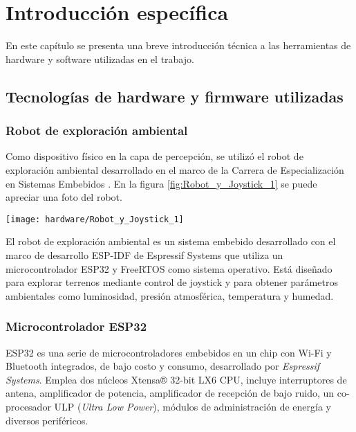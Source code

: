\chapter{Introducción específica} %

\label{Chapter2}



En este capítulo se presenta una breve introducción técnica a las herramientas de hardware y software utilizadas en el trabajo.

\section{Tecnologías de hardware y firmware utilizadas}


\subsection{Robot de exploración ambiental}

Como dispositivo físico en la capa de percepción, se utilizó el robot de exploración ambiental desarrollado en el marco de la Carrera de Especialización en Sistemas Embebidos \citep{cese_gonzalo_memoria}. En la figura \ref{fig:Robot_y_Joystick_1} se puede apreciar una foto del robot.


\begin{center}
   \texttt{[image: hardware/Robot\_y\_Joystick\_1]}
   \label{fig:Robot_y_Joystick_1}
\end{center}

El robot de exploración ambiental es un sistema embebido desarrollado con el marco de desarrollo ESP-IDF \cite{ESPIDF_home} de Espressif Systems que utiliza un microcontrolador ESP32 \cite{ESP32} y FreeRTOS \citep{FreeRTOS} como sistema operativo. Está diseñado para explorar terrenos mediante control de joystick y para obtener parámetros ambientales como luminosidad, presión atmosférica, temperatura y humedad.

\subsection{Microcontrolador ESP32}


ESP32 \cite{ESP32} es una serie de microcontroladores embebidos en un chip con Wi-Fi y Bluetooth integrados, de bajo costo y consumo, desarrollado por \textit{Espressif Systems}. Emplea dos núcleos Xtensa® 32-bit LX6 CPU, incluye interruptores de antena, amplificador de potencia, amplificador de recepción de bajo ruido, un co-procesador ULP (\textit{Ultra Low Power}), módulos de administración de energía y diversos periféricos.


